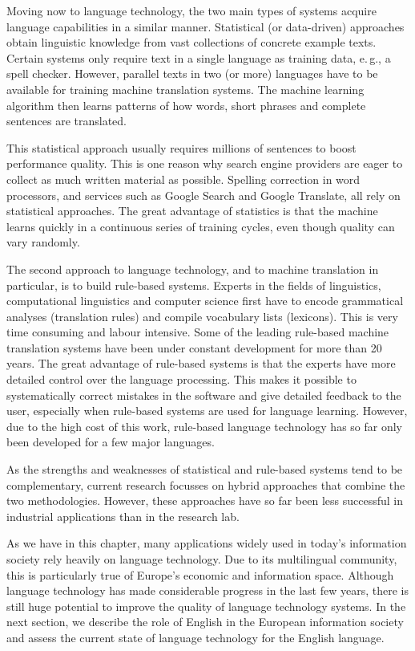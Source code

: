 \documentclass[]{../../metanetpaper}
\begin{document}
\begin{multicols}{2}
Moving now to language technology, the two main types of systems acquire language capabilities in a similar manner. Statistical (or data-driven) approaches obtain linguistic knowledge from vast collections of concrete example texts. Certain systems only require text in a single language as training data, e.\,g., a spell checker. However, parallel texts in two (or more) languages have to be available for training machine translation systems. The machine learning algorithm then learns patterns of how words, short phrases and complete sentences are translated. 

This statistical approach usually requires millions of sentences to boost performance quality. This is one reason why search engine providers are eager to collect as much written material as possible. Spelling correction in word processors, and services such as Google Search and Google Translate, all rely on statistical approaches. The great advantage of statistics is that the machine learns quickly in a continuous series of training cycles, even though quality can vary randomly.

The second approach to language technology, and to machine translation in particular, is to build rule-based systems. Experts in the fields of linguistics, computational linguistics and computer science first have to encode grammatical analyses (translation rules) and compile vocabulary lists (lexicons). This is very time consuming and labour intensive. Some of the leading rule-based machine translation systems have been under constant development for more than 20 years. The great advantage of rule-based systems is that the experts have more detailed control over the language processing. This makes it possible to systematically correct mistakes in the software and give detailed feedback to the user, especially when rule-based systems are used for language learning. However, due to the high cost of this work, rule-based language technology has so far only been developed for a few major languages. 


As the strengths and weaknesses of statistical and rule-based systems tend to be complementary, current research focusses on hybrid approaches that combine the two methodologies. However, these approaches have so far been less successful in industrial applications than in the research lab. 

As we have in this chapter, many applications widely used in today's information society rely heavily on language technology. Due to its multilingual community, this is particularly true of Europe's economic and information space. Although language technology has made considerable progress in the last few years, there is still huge potential to improve the quality of language technology systems. In the next section, we describe the role of English in the European information society and assess the current state of language technology for the English language. 
\end{multicols}
\end{document}
